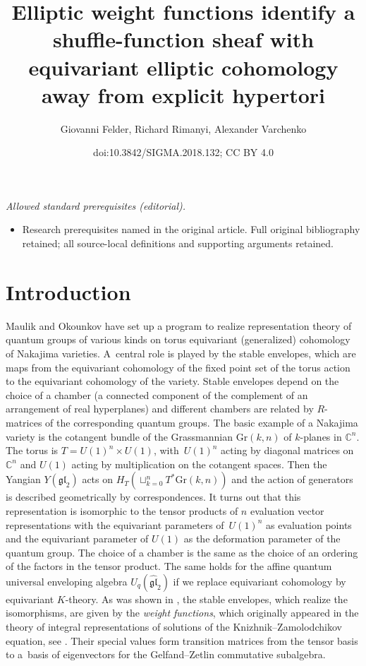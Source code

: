\documentclass[10pt,a4paper]{amsart}
\title{Elliptic weight functions identify a shuffle-function sheaf with equivariant elliptic cohomology away from explicit hypertori}
\author{Giovanni Felder, Richard Rimanyi, Alexander Varchenko}
\date{doi:10.3842/SIGMA.2018.132; CC BY 4.0}
\numberwithin{equation}{section}
\begin{document}
\maketitle
\noindent\textit{Allowed standard prerequisites (editorial).}\begin{itemize}
\item Research prerequisites named in the original article. Full original bibliography retained; all source-local definitions and supporting arguments retained.
\end{itemize}\medskip
\section{Introduction}\label{s-1}
Maulik and Okounkov \cite{MO} have set up a program to realize representation theory of quantum groups of various kinds on torus equivariant (generalized) cohomology of Nakajima varieties. A~central role is played by the stable envelopes, which are maps from the equivariant cohomology of the fixed point set of the torus action to the equivariant cohomology of the variety. Stable envelopes depend on the choice of a chamber (a connected component of the complement of an arrangement of real hyperplanes) and different chambers are related by $R$-matrices of the corresponding quantum groups. The basic example of a Nakajima variety is the cotangent bundle of the Grassmannian $\mathrm{Gr}(k,n)$ of $k$-planes in $\mathbb C^n$. The torus is $T=U(1)^{n}\times U(1)$, with~$U(1)^n$ acting by diagonal matrices on $\mathbb C^n$ and $U(1)$ acting by multiplication on the cotangent spaces. Then the Yangian $Y(\mathfrak{gl}_2)$ acts on $H_T(\sqcup_{k=0}^nT^*\mathrm{Gr}(k,n))$ and the action of generators is described geometrically by correspondences. It turns out that this representation is isomorphic to the tensor products of $n$ evaluation vector representations with the equivariant parameters of~$U(1)^n$ as evaluation points and the equivariant parameter of $U(1)$ as the deformation parameter of the quantum group. The choice of a chamber is the same as the choice of an ordering of the factors in the tensor product. The same holds for the affine quantum universal enveloping algebra $U_q(\widehat {\mathfrak{gl}}_2)$ if we replace equivariant cohomology by equivariant $K$-theory. As was shown in \cite{GRTV, RTV}, the stable envelopes, which realize the isomorphisms, are given by the {\em weight functions}, which originally appeared in the theory of integral representations of solutions of the Knizhnik--Zamolodchikov equation, see \cite{TV1,TV2}. Their special values form transition matrices from the tensor basis to a~basis of eigenvectors for the Gelfand--Zetlin commutative subalgebra.
\end{document}
